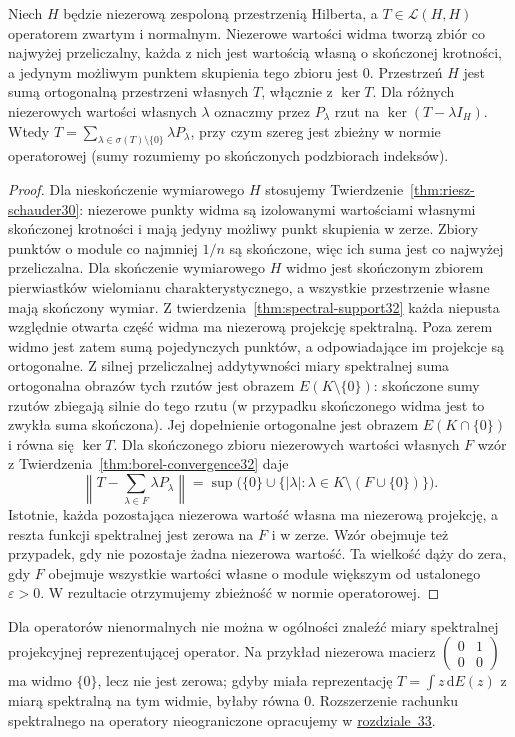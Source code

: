 \begin{twierdzenie}
\label{thm:compact-normal32}
Niech $H$ będzie niezerową zespoloną przestrzenią Hilberta,
a $T\in\mathcal L(H,H)$ operatorem zwartym i normalnym.
Niezerowe wartości widma tworzą zbiór co najwyżej przeliczalny,
każda z nich jest wartością własną o skończonej krotności,
a jedynym możliwym punktem skupienia tego zbioru jest $0$.
Przestrzeń $H$ jest sumą ortogonalną przestrzeni własnych $T$,
włącznie z $\ker T$. Dla różnych niezerowych wartości
własnych $\lambda$ oznaczmy przez $P_\lambda$ rzut na
$\ker(T-\lambda I_H)$. Wtedy
$T=\sum_{\lambda\in\sigma(T)\setminus\{0\}}
\lambda P_\lambda$, przy czym szereg jest zbieżny w normie
operatorowej (sumy rozumiemy po skończonych podzbiorach indeksów).
\end{twierdzenie}
\begin{proof}
Dla nieskończenie wymiarowego $H$ stosujemy
Twierdzenie~\ref{thm:riesz-schauder30}: niezerowe punkty
widma są izolowanymi wartościami własnymi skończonej
krotności i mają jedyny możliwy punkt skupienia w zerze.
Zbiory punktów o module co najmniej $1/n$ są skończone,
więc ich suma jest co najwyżej przeliczalna.
Dla skończenie wymiarowego $H$ widmo jest skończonym
zbiorem pierwiastków wielomianu charakterystycznego,
a wszystkie przestrzenie własne mają skończony wymiar.
Z twierdzenia~\ref{thm:spectral-support32} każda niepusta
względnie otwarta część widma ma niezerową projekcję spektralną.
Poza zerem widmo jest zatem sumą pojedynczych punktów,
a odpowiadające im projekcje są ortogonalne.
Z silnej przeliczalnej addytywności miary spektralnej
suma ortogonalna obrazów tych rzutów jest obrazem
$E(K\setminus\{0\})$: skończone sumy rzutów zbiegają
silnie do tego rzutu (w przypadku skończonego widma jest to
zwykła suma skończona). Jej dopełnienie ortogonalne jest
obrazem $E(K\cap\{0\})$ i równa się $\ker T$.
Dla skończonego zbioru niezerowych wartości własnych $F$
wzór z Twierdzenia~\ref{thm:borel-convergence32} daje
\[
\left\|T-\sum_{\lambda\in F}\lambda P_\lambda\right\|
=\sup\bigl(\{0\}\cup\{|\lambda|:\lambda\in K\setminus(F\cup\{0\})\}\bigr).
\]
Istotnie, każda pozostająca niezerowa wartość własna
ma niezerową projekcję, a reszta funkcji spektralnej
jest zerowa na $F$ i w zerze. Wzór obejmuje też
przypadek, gdy nie pozostaje żadna niezerowa wartość.
Ta wielkość dąży do zera, gdy $F$ obejmuje wszystkie
wartości własne o module większym od ustalonego $\varepsilon>0$.
W rezultacie otrzymujemy zbieżność w normie operatorowej.
\end{proof}

\begin{uwaga}
Dla operatorów nienormalnych nie można w ogólności znaleźć
miary spektralnej projekcyjnej reprezentującej operator.
Na przykład niezerowa macierz
$\left(\begin{smallmatrix}0&1\\0&0\end{smallmatrix}\right)$
ma widmo $\{0\}$, lecz nie jest zerowa; gdyby miała reprezentację
$T=\int z\,\mathrm dE(z)$ z miarą spektralną na tym widmie,
byłaby równa $0$. Rozszerzenie rachunku spektralnego na
operatory nieograniczone opracujemy w \hyperref[sec:unbounded33]{rozdziale~33}.
\end{uwaga}
